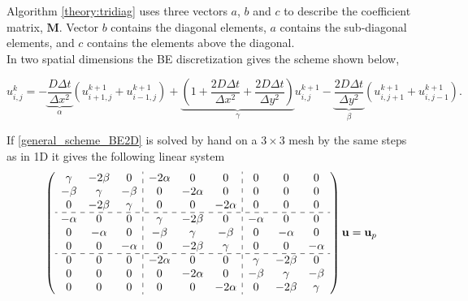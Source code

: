 {

 }

\noindent Algorithm \ref{theory:tridiag} uses three vectors $a$, $b$ and $c$ to describe the coefficient matrix, $\mathbf{M}$. Vector $b$ contains the diagonal elements, $a$ contains the sub-diagonal elements, and $c$ contains the elements above the diagonal. \\

In two spatial dimensions the BE discretization gives the scheme shown below,

\begin{equation}\label{general_scheme_BE2D}
 u^{k}_{i,j} = -\underbrace{\frac{D\Delta t}{\Delta x^2}}_{\alpha}\left(u^{k+1}_{i+1,j}+u^{k+1}_{i-1,j}\right) +
 \underbrace{\left(1+\frac{2D\Delta t}{\Delta x^2} +\frac{2D\Delta t}{\Delta y^2}\right)}_{\gamma}u^{k+1}_{i,j} 
 -\underbrace{\frac{2D\Delta t}{\Delta y^2}}_{\beta}\left(u^{k+1}_{i,j+1}+u^{k+1}_{i,j-1}\right).
\end{equation}

\noindent If \eqref{general_scheme_BE2D} is solved by hand on a $3\times3$ mesh by the same steps as in 1D it gives the following linear system
\begin{align}\label{linear_system_BE2D}
  \left(\begin{array}{c c c : c c c : c c c}
        \gamma & -2\beta &0 &-2\alpha &0 &0 &0 &0 &0\\
        -\beta & \gamma & -\beta &0 &-2\alpha &0 &0 &0 &0\\
        0&-2\beta & \gamma & 0 & 0 & -2\alpha &0&0&0\\ \hdashline
        -\alpha& 0&0 & \gamma & -2\beta & 0 & -\alpha &0&0\\
        0& -\alpha&0&-\beta & \gamma & -\beta & 0 & -\alpha &0\\
        0& 0& -\alpha&0&-2\beta & \gamma & 0 & 0 &-\alpha\\ \hdashline
        0& 0 &0 &-2\alpha &0&0 & \gamma & -2\beta&0\\
        0& 0 &0 &0 &-2\alpha&0&-\beta & \gamma &-\beta\\
         0&0 &0 &0&0 &-2\alpha&0&-2\beta & \gamma
       \end{array}\right)\mathbf{u} = \mathbf{u}_p
\end{align}


